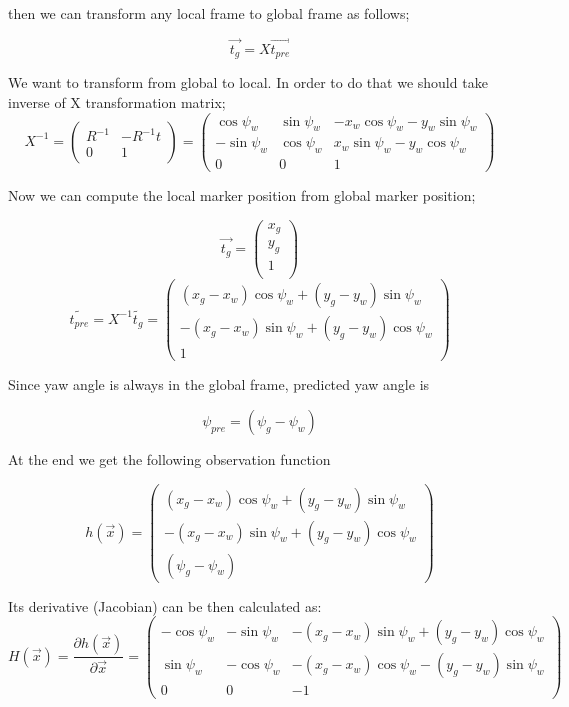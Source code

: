 \documentclass[14pt,a4paper]{article}
\begin{document}
		then we can transform any local frame to global frame as follows;
		
				\[\vec{t_g}= X \overrightarrow{t_{pre}} \]
				
		We want to transform from global to local. In order to do that we should take inverse of X transformation matrix;
		$$	X^{-1} =	\begin{pmatrix} 
		
					R^{-1} & -R^{-1}t \\
					0 & 1 
				\end{pmatrix}
			=	\begin{pmatrix}
					\cos\psi_{w}	 &	\sin\psi_{w} & -x_{w}\cos\psi_{w}-y_{w}\sin\psi_{w}\\	
					-\sin\psi_{w} &	\cos\psi_{w}	 &  x_{w}\sin\psi_{w}-y_{w}\cos\psi_{w}\\
					0		 &		0	&	1
				\end{pmatrix}
		$$
		
		
		Now we can compute the local marker position from global marker position;
		
		\[\vec{t_{g}}= \left( \begin{array}{c}
						x_{g} \\ y_{g}\\ 1\\
				\end{array} \right)\] 	
		$$
			\tilde{t_{pre}}  = X^{-1} \tilde{t_{g}}
			= \begin{pmatrix}
					(x_{g} - x_{w})\cos\psi_{w}	 +	(y_{g}-y_{w})\sin\psi_{w}\\ 	
					-(x_{g} - x_{w})\sin\psi_{w} +	(y_{g}-y_{w})\cos\psi_{w}\\
												1
				\end{pmatrix}
		$$
		
		Since yaw angle is always in the global frame, predicted yaw angle is
		
		\[ \psi_{pre}=(\psi_{g} - \psi_{w})\]
		
		At the end we get the following observation function
		
		$$
		h(\vec{x})	= \begin{pmatrix}
					(x_{g} - x_{w})\cos\psi_{w}	 +	(y_{g}-y_{w})\sin\psi_{w}\\ 	
					-(x_{g} - x_{w})\sin\psi_{w} +	(y_{g}-y_{w})\cos\psi_{w}\\
											(\psi_{g} - \psi_{w})
			\end{pmatrix}
		$$
		
		Its derivative (Jacobian) can be then calculated as:
				$$
		H(\vec{x})	= \frac{\partial h(\vec{x})}{\partial \vec{x}} = 
			\begin{pmatrix}
				-\cos\psi_{w} & -\sin\psi_{w} & -(x_g-x_w)\sin\psi_{w}+(y_g-y_w)\cos\psi_{w} \\
				\sin\psi_{w} & -\cos\psi_{w} & -(x_g-x_w)\cos\psi_{w}-(y_g-y_w)\sin\psi_{w} \\
				0 & 0 & -1 
			\end{pmatrix}
		$$
		
\end{document}

